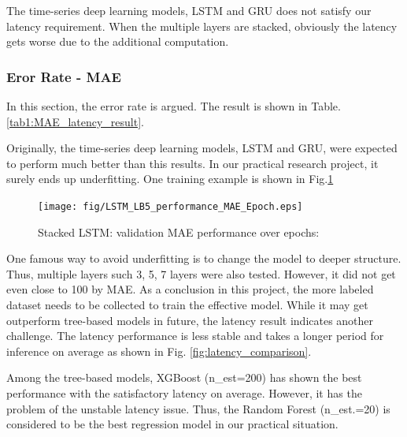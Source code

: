 \documentclass[runningheads]{llncs}
\begin{document}
The time-series deep learning models, LSTM and GRU does not satisfy our latency requirement. When the multiple layers are stacked, obviously the latency gets worse due to the additional computation.


\subsubsection{Eror Rate - MAE}
In this section, the error rate is argued. The result is shown in Table. \ref{tab1:MAE_latency_result}.

Originally, the time-series deep learning models, LSTM and GRU, were expected to perform much better than this results. In our practical research project, it surely ends up underfitting. One training example is shown in Fig.\ref{fig:stacked_lstm_training}

\begin{figure}[t]
 \begin{center}
  \texttt{[image: fig/LSTM\_LB5\_performance\_MAE\_Epoch.eps]}
  \caption{Stacked LSTM: validation MAE performance over epochs: }
  \label{fig:stacked_lstm_training}
 \end{center}
\end{figure}
One famous way to avoid underfitting is to change the model to deeper structure. Thus, multiple layers such 3, 5, 7 layers were also tested. However, it did not get even close to 100 by MAE. As a conclusion in this project, the more labeled dataset needs to be collected to train the effective model. While it may get outperform tree-based models in future, the latency result indicates another challenge. The latency performance is less stable and takes a longer period for inference on average as shown in Fig. \ref{fig:latency_comparison}.

Among the tree-based models, XGBoost (n\_est=200) has shown the best performance with the satisfactory latency on average. However, it has the problem of the unstable latency issue. Thus, the Random Forest (n\_est.=20) is considered to be the best regression model in our practical situation.
\end{document}
